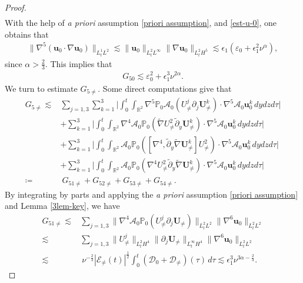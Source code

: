 \documentclass[11pt,reqno]{article}
\numberwithin{equation}{section}
\newcommand\R{{\mathbb R}}
\newcommand\PP{{\mathbb P}}
\newcommand\D{{\mathcal D}}
\newcommand\E{{\mathcal E}}
\newcommand\A{\mathcal{A}}
\newcommand\uu{\bm{u}}
\newcommand\U{\bm{U}}
\newcommand \tri {\coloneqq}
\let\pa=\partial
\let\na=\nabla
\let\al=\alpha
\let\var=\varepsilon
\let\f=\frac
\let\ep=\epsilon
\begin{document}
\begin{proof}
\begin{align}
\end{align}
With the help of \textit{a priori} assumption \eqref{priori assumption}, and \eqref{est-u-0}, one obtains that
\begin{align*}
    \| \nabla^5(\uu_{0}\cdot\nabla\uu_{0})\|_{L^1_tL^2}
    \lesssim 
\|\uu_{0}\|_{L^2_tL^\infty}\|\na\uu_{0}\|_{L^2_tH^5}
    \lesssim 
    \ep_1(\var_0+\ep_1^2\nu^{\al}),
\end{align*}
since $\alpha>\f23$.
This implies  that
\begin{align}\label{est-G50}
    G_{50}
    \lesssim \var_0^2+\ep_1^3\nu^{2\al}.
\end{align}
We turn to estimate $G_{5\not=}$. Some direct computations give that
\begin{align}\label{est-G5noq}
    G_{5\not=}
    \lesssim &
    \sum_{j=1,3}\sum_{k=1}^3\Big|\int_0^t \int_{\R^2}
    \nabla^5\PP_0\A_0(U^j_{\not=}\pa_j\U_{\not=}^k)\cdot\nabla^5 \A_0 \uu_0^k \,dydzd\tau \Big|
    \nonumber
    \\
    &+\sum_{k=1}^3\Big|\int_0^t \int_{\R^2}
    \nabla^4\A_0\PP_0(\widetilde{\nabla}U^2_{\not=}\tilde\pa_y\U_{\not=}^k)\cdot\nabla^5 \A_0 \uu_0^k \,dydzd\tau \Big|
    \nonumber
    \\
    &
    +\sum_{k=1}^3\Big|\int_0^t \int_{\R^2}
    \A_0\PP_0([\nabla^4,\tilde\pa_y\widetilde{\nabla}\U_{\not=}^k]U^2_{\not=})\cdot\nabla^5 \A_0 \uu_0^k \,dydzd\tau \Big|
    \nonumber
    \\
    &
    +\sum_{k=1}^3\Big|\int_0^t \int_{\R^2}
    \A_0\PP_0(\nabla^4U^2_{\not=}\tilde\pa_y\widetilde{\nabla}\U_{\not=}^k)\cdot\nabla^5 \A_0 \uu_0^k \,dydzd\tau \Big|
    \nonumber
    \\
    \tri&~G_{51\not=}+G_{52\not=}+G_{53\not=}+G_{54\not=}.
\end{align}
By integrating by parts and applying the \textit{a priori} assumption \eqref{priori assumption} and Lemma \ref{3lem-key}, we have
\begin{align}\label{est-G51noq}
    G_{51\not=}
    \lesssim &
    \sum_{j=1,3}\|\nabla^4\A_0\PP_0(U^j_{\not=}\pa_j\U_{\not=})\|_{L^2_tL^2}
    \|\nabla^6 \uu_0\|_{L^2_tL^2}
    \nonumber
    \\
    \lesssim &
    \sum_{j=1,3}\|U^j_{\not=}\|_{L^2_tH^4}
    \|\pa_j\U_{\not=}\|_{L^\infty_tH^4}
    \|\nabla^6 \uu_0\|_{L^2_tL^2}
    \nonumber
    \\
    \lesssim &~\nu^{-\f23} |\E_{\not=}(t)|^{\f12}\int_0^t(\D_{0}+\D_{\not=})(\tau)\,d\tau 
    \lesssim \ep_1^3 \nu^{3\al-\f23}.
\end{align}

\end{proof}
\end{document}
